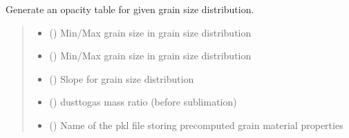 \documentclass[a4paper,11pt,english]{sphinxmanual}
\begin{document}

\begin{fulllineitems}
\label{\detokenize{x22:disk_model.generate_opacity_table_opt}}
\pysigstartsignatures
\pysiglinewithargsret
{}
{\sphinxparamcomma {}\sphinxparamcomma {}\sphinxparamcomma {}\sphinxparamcomma {}\sphinxparamcomma {}\sphinxparamcomma {}\sphinxparamcomma {}}
{}
\pysigstopsignatures
\sphinxAtStartPar
Generate an opacity table for given grain size distribution.
\begin{quote}\begin{description}
\begin{itemize}
\item {} 
\sphinxAtStartPar
{} () \textendash{} Min/Max grain size in grain size distribution

\item {} 
\sphinxAtStartPar
{} () \textendash{} Min/Max grain size in grain size distribution

\item {} 
\sphinxAtStartPar
{} () \textendash{} Slope for grain size distribution

\item {} 
\sphinxAtStartPar
{} () \textendash{} dust\sphinxhyphen{}to\sphinxhyphen{}gas mass ratio (before sublimation)

\item {} 
\sphinxAtStartPar
{} () \textendash{} Name of the pkl file storing pre\sphinxhyphen{}computed grain material properties


\end{itemize}
\end{description}
\end{quote}
\end{fulllineitems}
\end{document}
